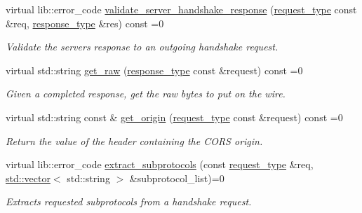\begin{DoxyCompactItemize}
virtual lib\+::error\+\_\+code \mbox{\hyperlink{classwebsocketpp_1_1processor_1_1processor_ab1228fa9350d9646379888ad528fd4c4}{validate\+\_\+server\+\_\+handshake\+\_\+response}} (\mbox{\hyperlink{classwebsocketpp_1_1http_1_1parser_1_1request}{request\+\_\+type}} const \&req, \mbox{\hyperlink{classwebsocketpp_1_1http_1_1parser_1_1response}{response\+\_\+type}} \&res) const =0
\begin{DoxyCompactList}\small\item\em Validate the server\textquotesingle{}s response to an outgoing handshake request. \end{DoxyCompactList}\item 
\mbox{\label{classwebsocketpp_1_1processor_1_1processor_a55ed343fecfcce5f312a2d0bc52c507e}} 
virtual std\+::string \mbox{\hyperlink{classwebsocketpp_1_1processor_1_1processor_a55ed343fecfcce5f312a2d0bc52c507e}{get\+\_\+raw}} (\mbox{\hyperlink{classwebsocketpp_1_1http_1_1parser_1_1response}{response\+\_\+type}} const \&request) const =0
\begin{DoxyCompactList}\small\item\em Given a completed response, get the raw bytes to put on the wire. \end{DoxyCompactList}\item 
\mbox{\label{classwebsocketpp_1_1processor_1_1processor_a76bcddf82275747217c945e78a91658f}} 
virtual std\+::string const  \& \mbox{\hyperlink{classwebsocketpp_1_1processor_1_1processor_a76bcddf82275747217c945e78a91658f}{get\+\_\+origin}} (\mbox{\hyperlink{classwebsocketpp_1_1http_1_1parser_1_1request}{request\+\_\+type}} const \&request) const =0
\begin{DoxyCompactList}\small\item\em Return the value of the header containing the C\+O\+RS origin. \end{DoxyCompactList}\item 
virtual lib\+::error\+\_\+code \mbox{\hyperlink{classwebsocketpp_1_1processor_1_1processor_abec64a667b46855187d821abcb7a5247}{extract\+\_\+subprotocols}} (const \mbox{\hyperlink{classwebsocketpp_1_1http_1_1parser_1_1request}{request\+\_\+type}} \&req, \mbox{\hyperlink{classstd_1_1vector}{std\+::vector}}$<$ std\+::string $>$ \&subprotocol\+\_\+list)=0
\begin{DoxyCompactList}\small\item\em Extracts requested subprotocols from a handshake request. \end{DoxyCompactList}\item 

\end{DoxyCompactItemize}

